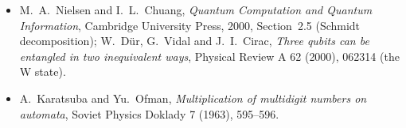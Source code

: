 \begin{itemize}
C.~R.~Johnson, \emph{Topics in Matrix Analysis}, Cambridge University Press, 1991, Chapter~4 (Kronecker products).
\item M.~A.~Nielsen and I.~L.~Chuang, \emph{Quantum Computation and Quantum Information}, Cambridge University Press, 2000,
Section~2.5 (Schmidt decomposition); W.~D\"ur, G.~Vidal and J.~I.~Cirac, \emph{Three qubits can be entangled in two inequivalent ways},
Physical Review A 62 (2000), 062314 (the W state).
\item A.~Karatsuba and Yu.~Ofman, \emph{Multiplication of multidigit numbers on automata}, Soviet Physics Doklady 7 (1963), 595--596.
\end{itemize}
